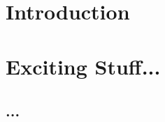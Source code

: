 \documentclass[10pt]{article}
\begin{document}



\section{Introduction}

\section{Exciting Stuff...}

\subsection{...}
\end{document}
